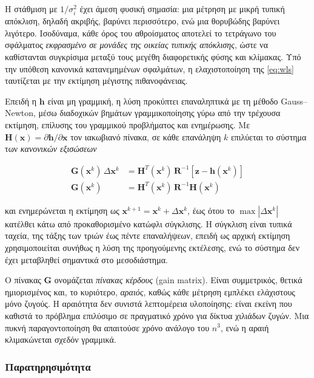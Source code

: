 Η στάθμιση με $1/\sigma_i^2$ έχει άμεση φυσική σημασία: μια μέτρηση με μικρή τυπική
απόκλιση, δηλαδή ακριβής, βαρύνει περισσότερο, ενώ μια θορυβώδης βαρύνει λιγότερο.
Ισοδύναμα, κάθε όρος του αθροίσματος αποτελεί το τετράγωνο του σφάλματος \emph{εκφρασμένο
σε μονάδες της οικείας τυπικής απόκλισης}, ώστε να καθίστανται συγκρίσιμα μεταξύ τους
μεγέθη διαφορετικής φύσης και κλίμακας. Υπό την υπόθεση κανονικά κατανεμημένων σφαλμάτων,
η ελαχιστοποίηση της \eqref{eq:wls} ταυτίζεται με την εκτίμηση μέγιστης πιθανοφάνειας.

Επειδή η $\mathbf{h}$ είναι μη γραμμική, η λύση προκύπτει επαναληπτικά με τη μέθοδο
Gauss--Newton, μέσω διαδοχικών βημάτων γραμμικοποίησης γύρω από την τρέχουσα εκτίμηση,
επίλυσης του γραμμικού προβλήματος και ενημέρωσης. Με
$\mathbf{H}(\mathbf{x}) = \partial \mathbf{h}/\partial \mathbf{x}$ τον ιακωβιανό πίνακα, σε
κάθε επανάληψη $k$ επιλύεται το σύστημα των \emph{κανονικών εξισώσεων}

\begin{align}
\mathbf{G}(\mathbf{x}^{k}) \, \Delta \mathbf{x}^{k}
  &= \mathbf{H}^{T}(\mathbf{x}^{k}) \, \mathbf{R}^{-1}
     \left[\mathbf{z} - \mathbf{h}(\mathbf{x}^{k})\right] \\
\mathbf{G}(\mathbf{x}^{k})
  &= \mathbf{H}^{T}(\mathbf{x}^{k}) \, \mathbf{R}^{-1} \mathbf{H}(\mathbf{x}^{k})
\label{eq:gain}
\end{align}

και ενημερώνεται η εκτίμηση ως $\mathbf{x}^{k+1} = \mathbf{x}^{k} + \Delta \mathbf{x}^{k}$,
έως ότου το $\max|\Delta \mathbf{x}^{k}|$ κατέλθει κάτω από προκαθορισμένο κατώφλι
σύγκλισης. Η σύγκλιση είναι τυπικά ταχεία, της τάξης των τριών έως πέντε επαναλήψεων,
επειδή ως αρχική εκτίμηση χρησιμοποιείται συνήθως η λύση της προηγούμενης εκτέλεσης, ενώ το
σύστημα δεν έχει μεταβληθεί σημαντικά στο μεσοδιάστημα.

Ο πίνακας $\mathbf{G}$ ονομάζεται \emph{πίνακας κέρδους} (gain matrix). Είναι συμμετρικός,
θετικά ημιορισμένος και, το κυριότερο, \emph{αραιός}, καθώς κάθε μέτρηση εμπλέκει ελάχιστους
μόνο ζυγούς. Η αραιότητα δεν συνιστά λεπτομέρεια υλοποίησης: είναι εκείνη που καθιστά το
πρόβλημα επιλύσιμο σε πραγματικό χρόνο για δίκτυα χιλιάδων ζυγών. Μια πυκνή παραγοντοποίηση
θα απαιτούσε χρόνο ανάλογο του $n^3$, ενώ η αραιή κλιμακώνεται σχεδόν γραμμικά.

\subsubsection*{Παρατηρησιμότητα}

